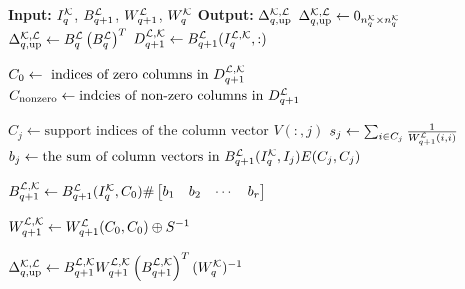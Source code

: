 \begin{algorithm}[H]
 \caption{\textsc{UpPersistentLaplacian}}
 \label{alg:pers_lap}
 \begin{algorithmic}[1]
 \State \textbf{Input:} $I_q^{\mathcal{K}}$, $B_{q+1}^{\mathcal{L}}$, $W_{q+1}^{\mathcal{L}}$, $W_{q}^{\mathcal{K}}$
 \State \textbf{Output:} $\Delta_{q, \mathrm{up}}^{\mathcal{K}, \mathcal{L}}$
\State $\Delta_{q, \mathrm{up}}^{\mathcal{K}, \mathcal{L}}\gets 0_{n_q^{\mathcal{K}}\times n_q^{\mathcal{K}}}$ 
 \State $\Delta_{q, \mathrm{up}}^{\mathcal{K}, \mathcal{L}}\gets B_q^{\mathcal{L}} \left(B_q^{\mathcal{L}}\right)^T$
 \Else
 \State $D_{q+1}^{\mathcal{L}, \mathcal{K}}\gets B_{q+1}^{\mathcal{L}}(I_q^{\mathcal{L}, \mathcal{K}}, :)$

 \State $C_0\gets \text{ indices of zero columns in }D_{q+1}^{\mathcal{L}, \mathcal{K}}$
 \State $C_{\text{nonzero}}\gets \text{indcies of non-zero columns in }D_{q+1}^{\mathcal{L}}$
 


\Statex


\State $C_j\gets \text{support indices of the column vector }V(:, j)$
\State $s_j\gets \sum_{i\in C_j}\frac{1}{W_{q+1}^{\mathcal{L}}(i, i)}$
\State $b_j\gets \text{the sum of column vectors in } B_{q+1}^{\mathcal{L}}(I_q^{\mathcal{K}}, I_j)E(C_j, C_j)$
\EndFor

\State $B_{q+1}^{\mathcal{L}, \mathcal{K}}\gets
    B_{q+1}^{\mathcal{L}}(I_q^{\mathcal{K}}, C_0) \#
    \begin{bmatrix}
    b_1 & b_2 & \cdots & b_r
    \end{bmatrix}$


\State $W_{q+1}^{\mathcal{L}, \mathcal{K}}\gets W_{q+1}^{\mathcal{L}}(C_0, C_0)\oplus S^{-1}$

\State $\Delta_{q, \text{up}}^{\mathcal{K}, \mathcal{L}}\gets B_{q+1}^{\mathcal{L}, \mathcal{K}}W_{q+1}^{\mathcal{L}, \mathcal{K}}\left(B_{q+1}^{\mathcal{L}, \mathcal{K}}\right)^T (W_q^{\mathcal{K}})^{-1}$

\EndIf
\end{algorithmic}
\end{algorithm}


